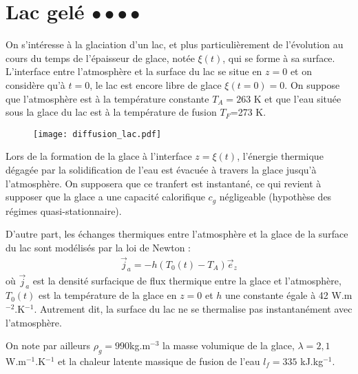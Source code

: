 \section{Lac gelé $\bullet\bullet\bullet\bullet$}

On s'intéresse à la glaciation d'un lac, et plus particulièrement de l'évolution au cours du temps de l'épaisseur de glace, notée $\xi(t)$, qui se forme à sa surface. L'interface entre l'atmosphère et la surface du lac se situe en $z=0$ et on considère qu'à $t=0$, le lac est encore libre de glace $\xi(t=0)=0$. On suppose que l'atmosphère est à la température constante $T_A=263$ K et que l'eau située sous la glace du lac est à la température de fusion $T_F$=273 K. 

\begin{figure}[h!]
\centering
  \texttt{[image: diffusion\_lac.pdf]}
\end{figure}

Lors de la formation de la glace à l'interface $z=\xi(t)$, l'énergie thermique dégagée par la solidification de l'eau est évacuée à travers la glace jusqu'à l'atmosphère. On supposera que ce tranfert est instantané, ce qui revient à supposer que la glace a une capacité calorifique $c_g$ négligeable (hypothèse des régimes quasi-stationnaire).

D'autre part, les échanges thermiques entre l'atmosphère et la glace de la surface du lac sont modélisés par la loi de Newton : 
\begin{align*}
	\vec{j}_a=-h(T_0(t)-T_A)\vec{e}_z
\end{align*}
où $\vec{j}_a$ est la densité surfacique de flux thermique entre la glace et l'atmosphère, $T_0(t)$ est la température de la glace en $z=0$ et $h$ une constante égale à 42 W.m$^{-2}$.K$^{-1}$. Autrement dit, la surface du lac ne se thermalise pas instantanément avec l'atmosphère. 

On note par ailleurs $\rho_g=990$kg.m$^{-3}$ la masse volumique de la glace, $\lambda=2,1$ W.m$^{-1}$.K$^{-1}$ et la chaleur latente massique de fusion de l'eau $l_f=335$ kJ.kg$^{-1}$.

